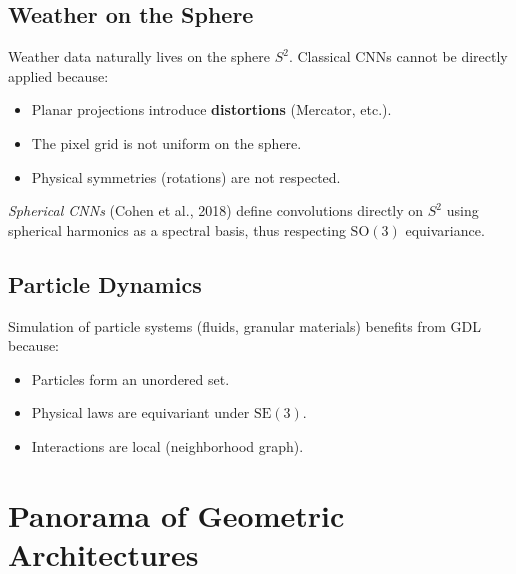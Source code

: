 \subsection{Weather on the Sphere}

Weather data naturally lives on the sphere $S^2$. Classical CNNs cannot be
directly applied because:
\begin{itemize}
    \item Planar projections introduce \textbf{distortions} (Mercator, etc.).
    \item The pixel grid is not uniform on the sphere.
    \item Physical symmetries (rotations) are not respected.
\end{itemize}

\begin{remark}
\textit{Spherical CNNs} (Cohen et al., 2018) define convolutions directly on
$S^2$ using spherical harmonics as a spectral basis, thus respecting
$\mathrm{SO}(3)$ equivariance.
\end{remark}

\subsection{Particle Dynamics}

Simulation of particle systems (fluids, granular materials) benefits from GDL
because:
\begin{itemize}
    \item Particles form an unordered set.
    \item Physical laws are equivariant under $\mathrm{SE}(3)$.
    \item Interactions are local (neighborhood graph).
\end{itemize}

\section{Panorama of Geometric Architectures}

